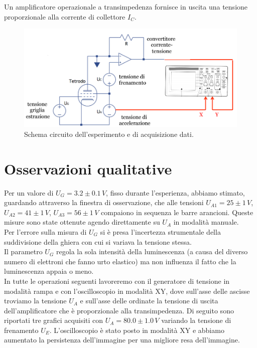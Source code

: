 \documentclass[10pt,a4paper]{article}
\begin{document}
Un amplificatore operazionale a transimpedenza fornisce in uscita una tensione proporzionale alla corrente di collettore $I_C$.\\

\begin{figure}[!htb]
  \centering
  \includegraphics[scale=.5]{circuito.png}
\caption{Schema circuito dell'esperimento e di acquisizione dati.}
\label{circuito}
\end{figure}


\section{Osservazioni qualitative}

Per un valore di $U_G = 3.2 \pm 0.1 \, V $, fisso durante l'esperienza, abbiamo stimato, guardando attraverso la finestra di osservazione, che alle tensioni $U_{A1} = 25 \pm 1 \, V$, $U_{A2} = 41 \pm 1 \, V$, $U_{A3} = 56 \pm 1 \, V$ compaiono in sequenza le barre arancioni. Queste misure sono state ottenute agendo direttamente su $U_A$ in modalità manuale.\\
Per l'errore sulla misura di $U_G$ si è presa l'incertezza strumentale della suddivisione della ghiera con cui si variava la tensione stessa.\\
Il parametro $U_G$ regola la sola intensità della luminescenza (a causa del diverso numero di elettroni che fanno urto elastico) ma non influenza il fatto che la luminescenza appaia o meno.\\
In tutte le operazioni seguenti lavoreremo con il generatore di tensione in modalità rampa e con l'oscilloscopio in modalità XY, dove sull'asse delle ascisse troviamo la tensione $U_A$ e sull'asse delle ordinate la tensione di uscita dell'amplificatore che è proporzionale alla transimpedenza. 
Di seguito sono riportati tre grafici acquisiti con $U_A = 80.0\pm1.0 \, V$ variando la tensione di frenamento $U_E$. L'oscilloscopio è stato posto in modalità XY e abbiamo aumentato la persistenza dell'immagine per una migliore resa dell'immagine.\\
\end{document}
